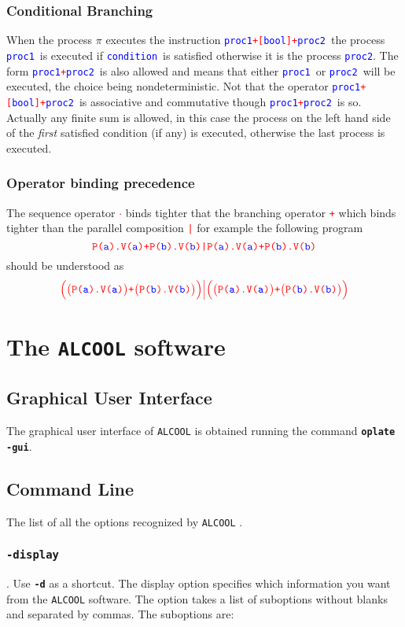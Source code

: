 \documentclass[article,11pt]{amsbook}
\def\wrn#1{\textcolor{red}{#1}}
\def\hil#1{\textcolor{blue}{#1}}
\def\bv#1{{\bf\texttt{#1}}}
\def\alcool{\texttt{ALCOOL} }
\def\proci{{\hil{\texttt{\scriptsize proc1}}}}
\def\procii{{\hil{\texttt{\scriptsize proc2}}}}
\def\condition{{\hil{\texttt{\scriptsize condition}}}}
\def\rulecall#1{\hil{{\texttt{#1}}}}
\def\kw#1{\wrn{\texttt{#1}}}
\def\ifthel{{\scriptsize \rulecall{proc1}\kw{+[}\rulecall{bool}\kw{]+}\rulecall{proc2}}}
\def\ifthelnb{{\scriptsize \rulecall{proc1}\kw{+}\rulecall{proc2}}}
\begin{document}
\subsection{Conditional Branching} When the process $\pi$ executes the
instruction \ifthel\ the process \proci\ is executed if \condition\ is
satisfied otherwise it is the process \procii. The form \ifthelnb\ is
also allowed and means that either \proci\ or \procii\ will be executed,
the choice being nondeterministic. Not that the operator \ifthel\ is
associative and commutative though \ifthelnb\ is so. Actually any finite
sum is allowed, in this case the process on the left hand side of the
{\em first} satisfied condition (if any) is executed, otherwise the last
process is executed.
\subsection{Operator binding precedence}
The sequence operator \kw{$\cdot$} binds tighter that the branching
operator \kw{+} which binds tighter than the parallel composition \kw{|}
for example the following program
\[
\kw{P(}\rulecall{a}\kw{).V(}\rulecall{a}\kw{)+P(}\rulecall{b}\kw{).V(}\rulecall{b}\kw{)|}\kw{P(}\rulecall{a}\kw{).V(}\rulecall{a}\kw{)+P(}\rulecall{b}\kw{).V(}\rulecall{b}\kw{)}     
\]
should be understood as\\
\[
\kw{\Big(\big(P(}\rulecall{a}\kw{).V(}\rulecall{a}\kw{)\big)+\big(P(}\rulecall{b}\kw{).V(}\rulecall{b}\kw{)\big)\Big)\Big|}\kw{\Big(\big(P(}\rulecall{a}\kw{).V(}\rulecall{a}\kw{)\big)+\big(P(}\rulecall{b}\kw{).V(}\rulecall{b}\kw{)\big)\Big)}
\]

\chapter{The \alcool software}
\section{Graphical User Interface}
The graphical user interface of \alcool is obtained running the command
\bv{oplate -gui}.
\section{Command Line}\noindent
The list of all the options recognized by \alcool.

\subsection{\texttt{-display}}. Use \bv{-d} as a shortcut. The display option
specifies which information you want from the \alcool software. The
option takes a list of suboptions without blanks and separated by
commas. The suboptions are:
\end{document}
